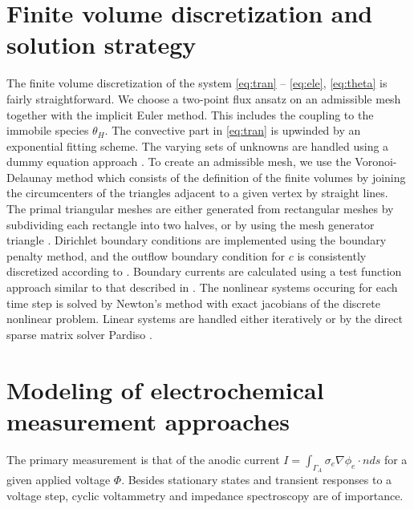 \documentclass[english,nofirstpagebreak,empty]{amsproc}
\begin{document}
\section{Finite volume discretization and solution strategy} 

The  finite volume  discretization  of the  system \eqref{eq:tran}  --
\eqref{eq:ele}, \eqref{eq:theta} is fairly straightforward. We choose a
two-point      flux     ansatz      on     an      admissible     mesh
\cite{EymardGallouetHerbin2000}  together   with  the  implicit  Euler
method.   This   includes  the   coupling  to  the   immobile  species
$\theta_H$. The  convective part in \eqref{eq:tran} is  upwinded by an
exponential fitting scheme. The  varying sets of unknowns are handled
using  a dummy  equation approach  \cite{Fuhrmann2002}.  To  create an
admissible mesh, we use  the Voronoi-Delaunay method which consists of
the definition of  the finite volumes by joining  the circumcenters of
the  triangles adjacent  to a  given  vertex by  straight lines.   The
primal triangular meshes are  either generated from rectangular meshes
by  subdividing each  rectangle into  two  halves, or  by using the  mesh
generator triangle \cite{Shewchuk2007}.  Dirichlet boundary conditions
are  implemented using the  boundary penalty  method, and  the outflow
boundary condition  for $c$  is consistently discretized  according to
\cite{FuhrmannLangmach2001}.  Boundary currents are calculated using a
test    function    approach   similar    to    that   described    in
\cite{GaertnerRichter2005}.  The nonlinear  systems occuring  for each
time step  is solved  by Newton's method  with exact jacobians  of the
discrete  nonlinear  problem.   Linear  systems  are  handled  either
iteratively   or  by   the  direct   sparse  matrix   solver  Pardiso
\cite{PARDISO}.
\section{Modeling of electrochemical measurement approaches}
The primary measurement is that of the
anodic current
$
  I=\int_{\Gamma_A} \sigma_e \nabla \phi_e \cdot n ds 
$
for a given applied voltage $\Phi$. Besides 
stationary states and transient responses to a voltage step,
cyclic voltammetry \cite{HarrimanGavaghanSueli2004} and impedance spectroscopy are of importance.
\end{document}
